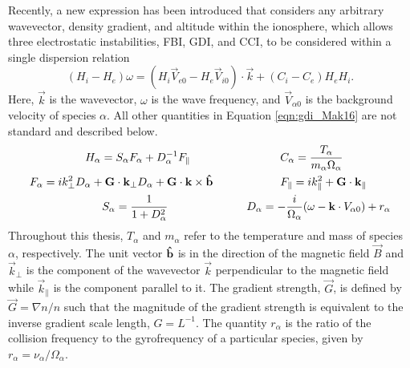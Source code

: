 Recently, a new expression has been introduced that considers any arbitrary wavevector, density gradient, and altitude within the ionosphere, which allows three electrostatic instabilities, FBI, GDI, and CCI, to be considered within a single dispersion relation \citep{Makarevich2016a}
\begin{equation}
	\label{eqn:gdi_Mak16}
	(H_i-H_e)\omega = (H_i\vec{V}_{e0}-H_e\vec{V}_{i0})\cdot\vec{k}+(C_i-C_e)H_eH_i.
\end{equation}
Here, \(\vec{k}\) is the wavevector, \(\omega\) is the wave frequency, and \(\vec{V}_{\alpha 0}\) is the background velocity of species \(\alpha\).  All other quantities in Equation \ref{eqn:gdi_Mak16} are not standard and described below.
\begin{equation}
\begin{split}
	H_\alpha = S_\alpha F_\alpha + D_\alpha^{-1} F_\parallel \quad\quad\quad\quad&\quad\quad\quad\quad 
	C_\alpha = \frac{T_\alpha}{m_\alpha \Omega_\alpha} \\
	F_\alpha = i k_\perp^2 D_\alpha + \mathbf{G}\cdot\mathbf{k}_\perp D_\alpha + \mathbf{G}\cdot\mathbf{k}\times\mathbf{\hat{b}} \quad\quad&\quad\quad\quad\quad
	F_\parallel = i k_\parallel^2 + \mathbf{G}\cdot\mathbf{k}_\parallel \\
	S_\alpha = \frac{1}{1+D_\alpha^2} \quad\quad\quad\quad\quad\quad&\quad
	D_\alpha = -\frac{i}{\Omega_\alpha}(\omega-\mathbf{k}\cdot{V}_{\alpha 0})+r_\alpha
\end{split}
\end{equation}
Throughout this thesis, \(T_\alpha\) and \(m_\alpha\) refer to the temperature and mass of species \(\alpha\), respectively.  The unit vector \(\mathbf{\hat{b}}\) is in the direction of the magnetic field \(\vec{B}\) and \(\vec{k}_\perp\) is the component of the wavevector \(\vec{k}\) perpendicular to the magnetic field while \(\vec{k}_\parallel\) is the component parallel to it.  The gradient strength, \(\vec{G}\), is defined by \(\vec{G} = \nabla n/n\) such that the magnitude of the gradient strength is equivalent to the inverse gradient scale length, \(G = L^{-1}\).  The quantity \(r_\alpha\) is the ratio of the collision frequency to the gyrofrequency of a particular species, given by \(r_\alpha = \nu_\alpha/\Omega_\alpha\).  

